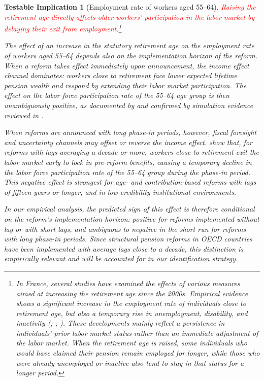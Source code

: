 \documentclass[11pt,english,a4paper, twoside, authoryear]{article}
\newtheorem{testable}{Testable Implication}
\begin{document}
\begin{testable}[Employment rate of workers aged 55--64]\label{test:emp_old} \textcolor{red}{Raising the retirement age directly affects older workers’ participation in the labor market by delaying their exit from employment.\footnote{In France, several studies have examined the effects of various measures aimed at increasing the retirement age since the 2000s. Empirical evidence shows a significant increase in the employment rate of individuals close to retirement age, but also a temporary rise in unemployment, disability, and inactivity (\cite{Rabate2020}; \cite{Dubois2016}; \cite{Leduigou2016}). These developments mainly reflect a persistence in individuals’ prior labor market status rather than an immediate adjustment of the labor market. When the retirement age is raised, some individuals who would have claimed their pension remain employed for longer, while those who were already unemployed or inactive also tend to stay in that status for a longer period.}}

The effect of an increase in the statutory retirement age on the employment rate of workers aged 55--64 depends also on the implementation horizon of the reform. When a reform takes effect immediately upon announcement, the income effect channel dominates: workers close to retirement face lower expected lifetime pension wealth and respond by extending their labor market participation. The effect on the labor force participation rate of the 55--64 age group is then unambiguously positive, as documented by \citet{StaubliZweimuller2013} and confirmed by simulation evidence reviewed in \citet{GruberWise1999}.

When reforms are announced with long phase-in periods, however, fiscal foresight and uncertainty channels may offset or reverse the income effect. \citet{BiZubairy2023} show that, for reforms with lags averaging a decade or more, workers close to retirement exit the labor market early to lock in pre-reform benefits, causing a temporary decline in the labor force participation rate of the 55--64 group during the phase-in period. This negative effect is strongest for age- and contribution-based reforms with lags of fifteen years or longer, and in low-credibility institutional environments.

In our empirical analysis, the predicted sign of this effect is therefore conditional on the reform's implementation horizon: positive for reforms implemented without lag or with short lags, and ambiguous to negative in the short run for reforms with long phase-in periods. Since structural pension reforms in OECD countries have been implemented with average lags close to a decade, this distinction is empirically relevant and will be accounted for in our identification strategy.
\end{testable}
\end{document}
